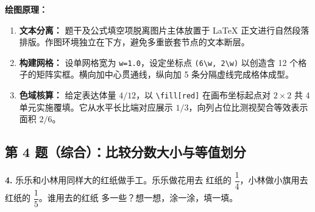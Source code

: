 \vspace{0.5cm}
\begin{center}
\end{center}

\vspace{0.5cm}
\textbf{绘图原理：}
\begin{enumerate}
    \item \textbf{文本分离：} 题干及公式填空项脱离图片主体放置于 LaTeX 正文进行自然段落排版。作图环境独立在下方，避免多重嵌套节点的文本断层。
    \item \textbf{构建网格：} 设单网格宽为 \texttt{w=1.0}，设定坐标点 \texttt{(6\textbackslash w, 2\textbackslash w)} 以创造含 12 个格子的矩阵实框。横向加中心贯通线，纵向加 5 条分隔虚线完成格体成型。
    \item \textbf{色域核算：} 给定表达体量 $4/12$，以 \texttt{\textbackslash fill[red]} 在画布坐标起点对 $2\times2$ 共 4 单元实施覆填。它从水平长比端对应展示 $1/3$，向列占位比测视契合等效表示面积 $2/6$。
\end{enumerate}

\vspace{1.5cm}

\newpage

\subsection{第 4 题（综合）：比较分数大小与等值划分}

\textbf{4.} 乐乐和小林用同样大的红纸做手工。乐乐做花用去
红纸的 $\dfrac{1}{4}$，小林做小旗用去红纸的 $\dfrac{1}{5}$。谁用去的红纸
多一些？想一想，涂一涂，填一填。

